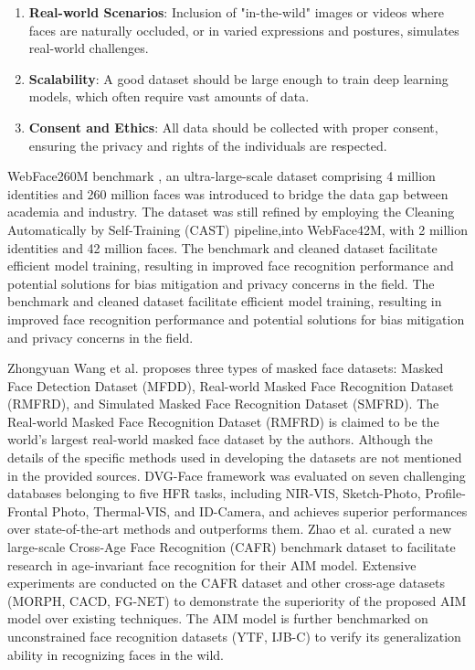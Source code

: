 \begin{enumerate}
    \item \textbf{Real-world Scenarios}: Inclusion of "in-the-wild" images or videos where faces are naturally occluded, or in varied expressions and postures, simulates real-world challenges.

    \item \textbf{Scalability}: A good dataset should be large enough to train deep learning models, which often require vast amounts of data.

    \item \textbf{Consent and Ethics}: All data should be collected with proper consent, ensuring the privacy and rights of the individuals are respected.
\end{enumerate}



WebFace260M benchmark \cite{zhu_webface260m_2023}, an ultra-large-scale dataset comprising 4 million identities and 260 million faces was introduced to bridge the data gap between academia and industry. The dataset was still refined by employing the Cleaning Automatically by Self-Training (CAST) pipeline,into WebFace42M, with 2 million identities and 42 million faces. The benchmark and cleaned dataset facilitate efficient model training, resulting in improved face recognition performance and potential solutions for bias mitigation and privacy concerns in the field. The benchmark and cleaned dataset facilitate efficient model training, resulting in improved face recognition performance and potential solutions for bias mitigation and privacy concerns in the field.

Zhongyuan Wang et al. \cite{wang_masked_2023} proposes three types of masked face datasets: Masked Face Detection Dataset (MFDD), Real-world Masked Face Recognition Dataset (RMFRD), and Simulated Masked Face Recognition Dataset (SMFRD). The Real-world Masked Face Recognition Dataset (RMFRD) is claimed to be the world's largest real-world masked face dataset by the authors. Although the details of the specific methods used in developing the datasets are not mentioned in the provided sources. DVG-Face framework \cite{fu_dvg-face_2022} was evaluated on seven challenging databases belonging to five HFR tasks, including NIR-VIS, Sketch-Photo, Profile-Frontal Photo, Thermal-VIS, and ID-Camera, and achieves superior performances over state-of-the-art methods and outperforms them. Zhao et al. \cite{zhao_towards_2022} curated a new large-scale Cross-Age Face Recognition (CAFR) benchmark dataset to facilitate research in age-invariant face recognition for their AIM model. Extensive experiments are conducted on the CAFR dataset and other cross-age datasets (MORPH, CACD, FG-NET) to demonstrate the superiority of the proposed AIM model over existing techniques. The AIM model is further benchmarked on unconstrained face recognition datasets (YTF, IJB-C) to verify its generalization ability in recognizing faces in the wild.

